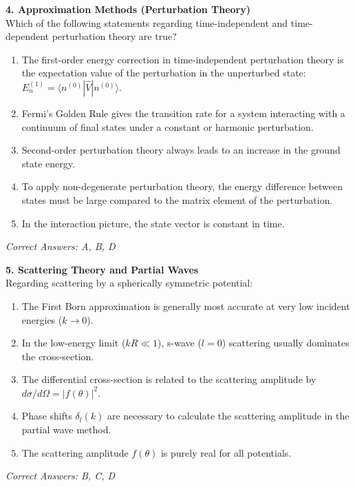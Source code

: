 \documentclass[a4paper,11pt]{article}
\begin{document}
\noindent\textbf{4. Approximation Methods (Perturbation Theory)}\\
Which of the following statements regarding time-independent and time-dependent perturbation theory are true?

\begin{enumerate}[label=\Alph*.]
    \item The first-order energy correction in time-independent perturbation theory is the expectation value of the perturbation in the unperturbed state: $E_n^{(1)} = \langle n^{(0)} | \hat{V} | n^{(0)} \rangle$.
    \item Fermi's Golden Rule gives the transition rate for a system interacting with a continuum of final states under a constant or harmonic perturbation.
    \item Second-order perturbation theory always leads to an increase in the ground state energy.
    \item To apply non-degenerate perturbation theory, the energy difference between states must be large compared to the matrix element of the perturbation.
    \item In the interaction picture, the state vector is constant in time.
\end{enumerate}
\textit{Correct Answers: A, B, D}

\vspace{0.5cm}

\noindent\textbf{5. Scattering Theory and Partial Waves}\\
Regarding scattering by a spherically symmetric potential:

\begin{enumerate}[label=\Alph*.]
    \item The First Born approximation is generally most accurate at very low incident energies ($k \to 0$).
    \item In the low-energy limit ($kR \ll 1$), s-wave ($l=0$) scattering usually dominates the cross-section.
    \item The differential cross-section is related to the scattering amplitude by $d\sigma/d\Omega = |f(\theta)|^2$.
    \item Phase shifts $\delta_l(k)$ are necessary to calculate the scattering amplitude in the partial wave method.
    \item The scattering amplitude $f(\theta)$ is purely real for all potentials.
\end{enumerate}
\textit{Correct Answers: B, C, D}
\end{document}
